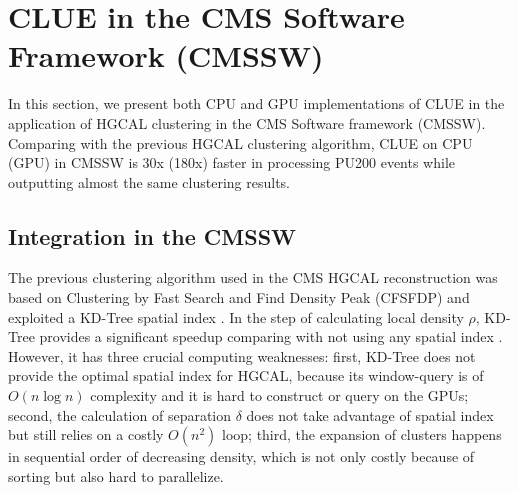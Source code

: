 \section{CLUE in the CMS Software Framework (CMSSW)}
\label{sec:cmsswClue}



In this section, we present both CPU and GPU implementations of CLUE in the application of HGCAL clustering in the CMS Software framework (CMSSW). Comparing with the previous HGCAL clustering algorithm, CLUE on CPU (GPU) in CMSSW is 30x (180x) faster in processing PU200 events while outputting almost the same clustering results.


\subsection{Integration in the CMSSW}



The previous clustering algorithm \cite{Chen:2017btc} used in the CMS HGCAL reconstruction was based on Clustering by Fast Search and Find Density Peak (CFSFDP) \cite{rodriguez2014clustering} and exploited a KD-Tree spatial index \cite{Bentley:1975:MBS:361002.361007}. In the step of calculating local density $\rho$, KD-Tree provides a significant speedup comparing with not using any spatial index \cite{Chen:2017btc}. However, it has three crucial computing weaknesses: first, KD-Tree does not provide the optimal spatial index for HGCAL, because its window-query is of $O(n\log n)$ complexity and it is hard to construct or query on the GPUs; second, the calculation of separation $\delta$ does not take advantage of spatial index but still relies on a costly $O(n^2)$ loop; third, the expansion of clusters happens in sequential order of decreasing density, which is not only costly because of sorting but also hard to parallelize.


